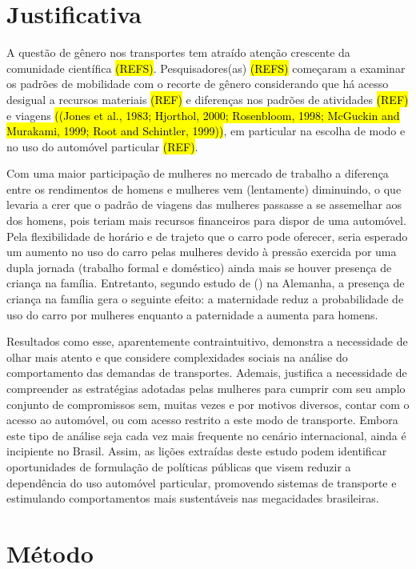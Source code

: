 \section{Justificativa}

A questão de gênero nos transportes tem atraído atenção crescente da comunidade científica \hl{(REFS)}.
Pesquisadores(as) \hl{(REFS)} começaram a examinar os padrões de mobilidade com o recorte de gênero considerando que há acesso desigual a recursos materiais \hl{(REF)} e diferenças nos padrões de atividades \hl{(REF)} e viagens \hl{((Jones et al., 1983; Hjorthol, 2000; Rosenbloom, 1998; McGuckin and Murakami, 1999; Root and Schintler, 1999))}, em particular na escolha de modo e no uso do automóvel particular \hl{(REF)}.

Com uma maior participação de mulheres no mercado de trabalho a diferença entre os rendimentos de homens e mulheres vem (lentamente) diminuindo, o que levaria a crer que o padrão de viagens das mulheres passasse a se assemelhar aos dos homens, pois teriam mais recursos financeiros para dispor de uma automóvel. Pela flexibilidade de horário e de trajeto que o carro pode oferecer, seria esperado um aumento no uso do carro pelas mulheres devido à pressão exercida por uma dupla jornada (trabalho formal e doméstico) ainda mais se houver presença de criança na família. Entretanto, segundo estudo de  (\citeyear{BEST2005}) na Alemanha, a presença de criança na família gera o seguinte efeito: a maternidade reduz a probabilidade de uso do carro por mulheres enquanto a paternidade a aumenta para homens.

Resultados como esse, aparentemente contraintuitivo, demonstra a necessidade de olhar mais atento e que considere complexidades sociais na análise do comportamento das demandas de transportes. Ademais, justifica a necessidade de compreender as estratégias adotadas pelas mulheres para cumprir com seu amplo conjunto de compromissos sem, muitas vezes e por motivos diversos, contar com o acesso ao automóvel, ou com acesso restrito a este modo de transporte.
Embora este tipo de análise seja cada vez mais frequente no cenário internacional, ainda é incipiente no Brasil. Assim, as lições extraídas deste estudo podem identificar oportunidades de formulação de políticas públicas que visem reduzir a dependência do uso automóvel particular, promovendo sistemas de transporte e estimulando comportamentos mais sustentáveis nas megacidades brasileiras.

\section{Método}

